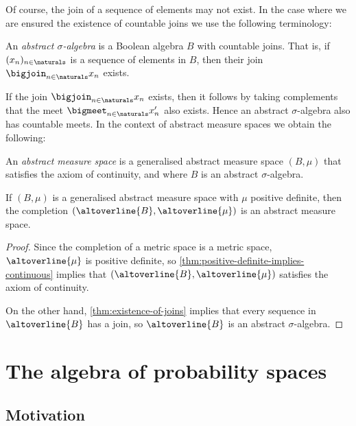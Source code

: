 \documentclass[article, a4paper, 11pt, oneside]{memoir}
\numberwithin{equation}{chapter}
\begin{document}
Of course, the join of a sequence of elements may not exist. In the case where we are ensured the existence of countable joins we use the following terminology:

\begin{definition}
    An \emph{abstract $\sigma$-algebra} is a Boolean algebra $B$ with countable joins. That is, if $(x_n)_{n\in\naturals}$ is a sequence of elements in $B$, then their join $\bigjoin_{n\in\naturals} x_n$ exists.
\end{definition}
%
If the join $\bigjoin_{n\in\naturals} x_n$ exists, then it follows by taking complements that the meet $\bigmeet_{n\in\naturals} x_n'$ also exists. Hence an abstract $\sigma$-algebra also has countable meets. In the context of abstract measure spaces we obtain the following:

\begin{definition}
    An \emph{abstract measure space} is a generalised abstract measure space $(B,\mu)$ that satisfies the axiom of continuity, and where $B$ is an abstract $\sigma$-algebra.
\end{definition}

\begin{lemma}
    If $(B,\mu)$ is a generalised abstract measure space with $\mu$ positive definite, then the completion $(\altoverline{B},\altoverline{\mu})$ is an abstract measure space.
\end{lemma}

\begin{proof}
    Since the completion of a metric space is a metric space, $\altoverline{\mu}$ is positive definite, so \cref{thm:positive-definite-implies-continuous} implies that $(\altoverline{B},\altoverline{\mu})$ satisfies the axiom of continuity.

    On the other hand, \cref{thm:existence-of-joins} implies that every sequence in $\altoverline{B}$ has a join, so $\altoverline{B}$ is an abstract $\sigma$-algebra.
\end{proof}



\chapter{The algebra of probability spaces}

\section{Motivation}
\end{document}

